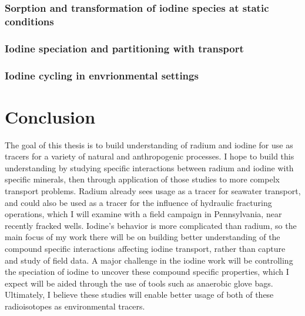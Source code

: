 \documentclass[twoside,12pt,titlepage]{article}
\begin{document}
\subsubsection{Sorption and transformation of iodine species at static conditions}

\subsubsection{Iodine speciation and partitioning with transport}

\subsubsection{Iodine cycling in envrionmental settings}

\section{Conclusion}

The goal of this thesis is to build understanding of radium and iodine for use as tracers for a variety of natural and anthropogenic processes. I hope to build this understanding by studying specific interactions between radium and iodine with specific minerals, then through application of those studies to more compelx transport problems. Radium already sees usage as a tracer for seawater transport, and could also be used as a tracer for the influence of hydraulic fracturing operations, which I will examine with a field campaign in Pennsylvania, near recently fracked wells. Iodine's behavior is more complicated than radium, so the main focus of my work there will be on building better understanding of the compound specific interactions affecting iodine transport, rather than capture and study of field data. A major challenge in the iodine work will be controlling the speciation of iodine to uncover these compound specific properties, which I expect will be aided through the use of tools such as anaerobic glove bags. Ultimately, I believe these studies will enable better usage of both of these radioisotopes as environmental tracers.



\end{document}
